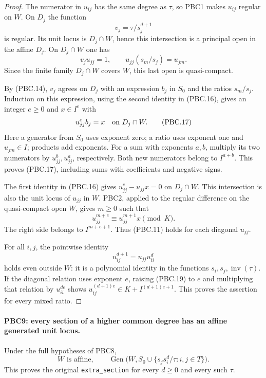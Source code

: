\begin{proof}
The numerator in $u_{ij}$ has the same degree as $\tau$, so
PBC1 makes $u_{ij}$ regular on $W$.  On $D_j$ the function
\[
 v_j=\tau/s_j^{d+1}
\]
is regular.  Its unit locus is $D_j\cap W$, hence this
intersection is a principal open in the affine $D_j$.
On $D_j\cap W$ one has
\[
 v_ju_{jj}=1,\qquad
 u_{jj}(s_m/s_j)=u_{jm}.
                                                        \tag{PBC.16}
\]
Since the finite family $D_j\cap W$ covers $W$, this last open
is quasi-compact.

By (PBC.14), $v_j$ agrees on $D_j$ with an expression $b_j$
in $S_0$ and the ratios $s_m/s_j$.  Induction on this expression,
using the second identity in (PBC.16), gives an integer $e\ge0$
and $x\in I^e$ with
\[
 u_{jj}^e b_j=x\quad\hbox{on }D_j\cap W.
                                                        \tag{PBC.17}
\]
Here a generator from $S_0$ uses exponent zero; a ratio uses
exponent one and $u_{jm}\in I$; products add exponents.
For a sum with exponents $a,b$, multiply its two numerators
by $u_{jj}^b,u_{jj}^a$, respectively.  Both new numerators
belong to $I^{a+b}$.  This proves (PBC.17), including sums
with coefficients and negative signs.

The first identity in (PBC.16) gives
$u_{jj}^e-u_{jj}x=0$ on $D_j\cap W$.
This intersection is also the unit locus of $u_{jj}$ in $W$.
PBC2, applied to the regular difference on the quasi-compact
open $W$, gives $m\ge0$ such that
\[
 u_{jj}^{m+e}
       \equiv u_{jj}^{m+1}x \pmod K.
                                                        \tag{PBC.18}
\]
The right side belongs to $I^{m+e+1}$.  Thus (PBC.11)
holds for each diagonal $u_{jj}$.

For all $i,j$, the pointwise identity
\[
 u_{ij}^{d+1}=u_{jj}u_{ii}^{d}
                                                        \tag{PBC.19}
\]
holds even outside $W$: it is a polynomial identity in the
functions $s_i,s_j,\operatorname{inv}(\tau)$.
If the diagonal relation uses exponent $e$, raising
(PBC.19) to $e$ and multiplying that relation by $u_{ii}^{de}$
shows
$u_{ij}^{(d+1)e}\in K+I^{(d+1)e+1}$.
This proves the assertion for every mixed ratio.
\end{proof}

\paragraph{PBC9: every section of a higher common degree has an affine generated unit locus.}
\label{claim:PBC9}
Under the full hypotheses of PBC8,
\[
 W\text{ is affine},\qquad
 \operatorname{Gen}\bigl(W,S_0\cup\{s_j s_i^d/\tau:i,j\in T\}\bigr).
                                                        \tag{PBC.20}
\]
This proves the original \texttt{extra\_section} for every
$d\ge0$ and every such $\tau$.

